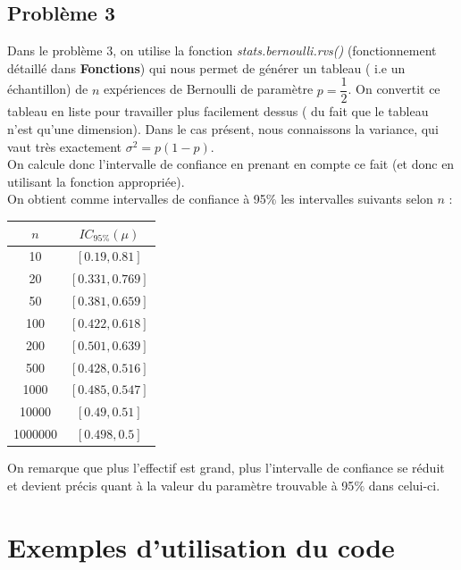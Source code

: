 \documentclass{article}      %
\begin{document}
\subsection{Problème 3}
Dans le problème 3, on utilise la fonction \textit{stats.bernoulli.rvs()} (fonctionnement détaillé dans \textbf{Fonctions}) qui nous permet de générer un tableau ( i.e un échantillon) de $n$ expériences de Bernoulli de paramètre $p = \dfrac{1}{2}$. On convertit ce tableau en liste pour travailler plus facilement dessus ( du fait que le tableau n'est qu'une dimension). Dans le cas présent, nous connaissons la variance, qui vaut très exactement $\sigma^{2} = p(1-p)$.\\
On calcule donc l'intervalle de confiance en prenant en compte ce fait (et donc en utilisant la fonction appropriée).\\
On obtient comme intervalles de confiance à 95$\%$ les intervalles suivants selon $n$ : \\

\begin{center}
	\begin{tabular}{|c|c|}
		\hline 
		$n$ & $IC_{95\%}(\mu)$ \\ 
		\hline 
		10 & $[0.19, 0.81]$ \\ 
		\hline 
		20 & $[0.331, 0.769]$ \\ 
		\hline 
		50 & $[0.381, 0.659]$ \\ 
		\hline 
		100 & $[0.422, 0.618]$ \\ 
		\hline 
		200 & $[0.501, 0.639]$ \\ 
		\hline 
		500 & $[0.428, 0.516]$ \\ 
		\hline 
		1000 & $[0.485, 0.547]$ \\ 
		\hline 
		10000 & $[0.49, 0.51]$ \\ 
		\hline 
		1000000 & $[0.498, 0.5]$ \\ 
		\hline 
	\end{tabular}
\end{center}

On remarque que plus l'effectif est grand, plus l'intervalle de confiance se réduit et devient précis quant à la valeur du paramètre trouvable à 95$\%$ dans celui-ci. 

\section{Exemples d'utilisation du code}
\end{document}
